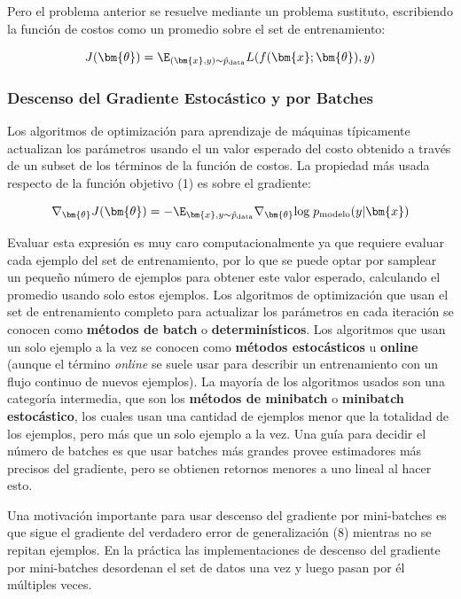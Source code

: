 Pero el problema anterior se resuelve mediante un problema sustituto, escribiendo la funci\'on de costos como un promedio sobre el set de entrenamiento:

\begin{equation}
J(\bm{\theta}) = \E_{(\bm{x},y)\sim \hat{p}_{\textrm{data}}}L(f(\bm{x};\bm{\theta}),y)
\end{equation}

\subsubsection{Descenso del Gradiente Estoc\'astico y por Batches}

Los algoritmos de optimizaci\'on para aprendizaje de m\'aquinas t\'ipicamente actualizan los par\'ametros usando el un valor esperado del costo obtenido a trav\'es de un subset de los t\'erminos de la funci\'on de costos. La propiedad m\'as usada respecto de la funci\'on objetivo (1) es sobre el gradiente:

\begin{equation}
\nabla_{\bm{\theta}}J(\bm{\theta}) = -\E_{\bm{x},y\sim \hat{p}_{\textrm{data}}}\nabla_{\bm{\theta}}\textrm{log}\; p_{\textrm{modelo}}(y|\bm{x})
\end{equation}

Evaluar esta expresi\'on es muy caro computacionalmente ya que requiere evaluar cada ejemplo del set de entrenamiento, por lo que se puede optar por samplear un peque{\~{n}}o n\'umero de ejemplos para obtener este valor esperado, calculando el promedio usando solo estos ejemplos. Los algoritmos de optimizaci\'on que usan el set de entrenamiento completo para actualizar los par\'ametros en cada iteraci\'on se conocen como \textbf{m\'etodos de batch} o \textbf{determin\'isticos}. Los algoritmos que usan un solo ejemplo a la vez se conocen como \textbf{m\'etodos estoc\'asticos} u \textbf{online} (aunque el t\'ermino \textit{online} se suele usar para describir un entrenamiento con un flujo continuo de nuevos ejemplos). La mayor\'ia de los algoritmos usados son una categor\'ia intermedia, que son los \textbf{m\'etodos de minibatch} o \textbf{minibatch estoc\'astico}, los cuales usan una cantidad de ejemplos menor que la totalidad de los ejemplos, pero m\'as que un solo ejemplo a la vez. Una gu\'ia para decidir el n\'umero de batches es que usar batches m\'as grandes provee estimadores m\'as precisos del gradiente, pero se obtienen retornos menores a uno lineal al hacer esto.

Una motivaci\'on importante para usar descenso del gradiente por mini-batches es que sigue el gradiente del verdadero error de generalizaci\'on (8) mientras no se repitan ejemplos. En la pr\'actica las implementaciones de descenso del gradiente por mini-batches desordenan el set de datos una vez y luego pasan por \'el m\'ultiples veces.

